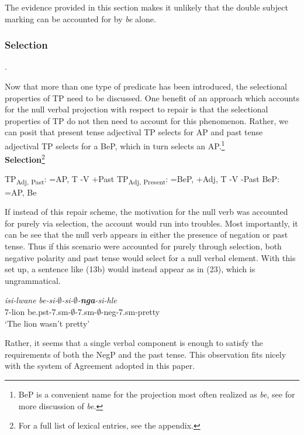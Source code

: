 \documentclass[output=paper]{langsci/langscibook}
\newcommand{\bee}[0]{\textit {be }}
\begin{document}
The evidence provided in this section makes it unlikely that the double subject marking can be accounted for by \bee alone. 



\subsubsection{Selection}. 

Now that more than one type of predicate has been introduced, the selectional properties of TP need to be discussed. One benefit of an approach which accounts for the null verbal projection with respect to repair is that the selectional properties of TP do not then need to account for this phenomenon. Rather, we can posit that present tense adjectival TP selects for AP and past tense adjectival TP selects for a BeP, which in turn selects an AP.\footnote{BeP is a convenient name for the projection most often realized as \textit{be}, see  for more discussion of \textit{be}.}
\\

\textbf{Selection}\footnote{For a full list of lexical entries, see the appendix.}
\begin{exe}
\ex TP\textsubscript{Adj, Past}: =AP, T -V +Past
\ex TP\textsubscript{Adj, Present}: =BeP, +Adj, T -V -Past
\ex BeP: =AP, Be 
\end{exe}

If instead of this repair scheme, the motivation for the null verb was accounted for purely via selection, the account would run into troubles. Most importantly, it can be see that the null verb appears in either the presence of negation or past tense. Thus if this scenario were accounted for purely through selection, both negative polarity and past tense would select for a null verbal element. With this set up, a sentence like (13b) would instead appear as in (23), which is ungrammatical.

\begin{exe}
\ex \gll *\textit{isi-lwane} \textit{be-si-$\emptyset$-si-$\emptyset$-{\bf nga}-si-hle}\\
       7-lion be.{\sc pst}-7.{\sc sm}-$\emptyset$-7.{\sc sm}-$\emptyset$-{\sc neg}-7.{\sc sm}-pretty\\
    \glt `The lion wasn't pretty' 
\end{exe}

Rather, it seems that a single verbal component is enough to satisfy the requirements of both the NegP and the past tense. This observation fits nicely with the system of Agreement adopted in this paper.
\end{document}
